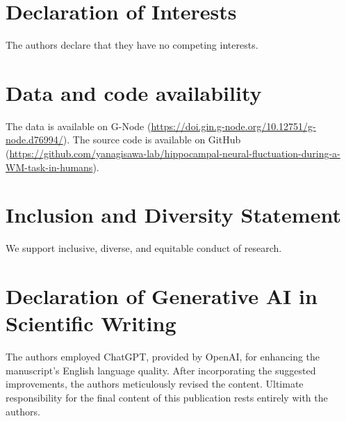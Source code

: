 \documentclass[final,3p,times,twocolumn]{elsarticle}
\begin{document}
\section*{Declaration of Interests}
The authors declare that they have no competing interests.
\label{declaration of interests}

\section*{Data and code availability}
The data is available on G-Node (\url{https://doi.gin.g-node.org/10.12751/g-node.d76994/}). The source code is available on GitHub (\url{https://github.com/yanagisawa-lab/hippocampal-neural-fluctuation-during-a-WM-task-in-humans}).
\label{data and code availability}

\section*{Inclusion and Diversity Statement}
We support inclusive, diverse, and equitable conduct of research.
\label{inclusion and diversity statement}

\section*{Declaration of Generative AI in Scientific Writing}
The authors employed ChatGPT, provided by OpenAI, for enhancing the manuscript's English language quality. After incorporating the suggested improvements, the authors meticulously revised the content. Ultimate responsibility for the final content of this publication rests entirely with the authors.
\label{declaration of generative ai in scientific writing}


\clearpage
\end{document}
